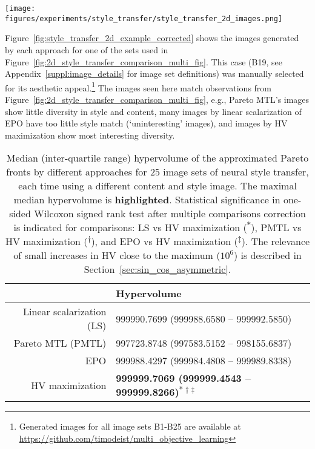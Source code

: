\begin{figure*}[h!]
\centering
\texttt{[image: figures/experiments/style\_transfer/style\_transfer\_2d\_images.png]}
\caption{Images generated by all four approaches for image set B19.} %
\label{fig:style_transfer_2d_example_corrected}
\end{figure*}

Figure~\ref{fig:style_transfer_2d_example_corrected} shows the images generated by each approach for one of the sets used in Figure~\ref{fig:2d_style_transfer_comparison_multi_fig}. This case (B19, see Appendix~\ref{suppl:image_details} for image set definitions) was manually selected for its aesthetic appeal.\footnote{Generated images for all image sets B1-B25 are available at \url{https://github.com/timodeist/multi_objective_learning}}%
The images seen here match observations from Figure~\ref{fig:2d_style_transfer_comparison_multi_fig}, e.g., Pareto MTL's images show little diversity in style and content, many images by linear scalarization of EPO have too little style match (`uninteresting' images), and images by HV maximization show most interesting diversity.

\begin{table}[]
\renewcommand{\arraystretch}{1.5}
\centering
\caption{\small{Median (inter-quartile range) hypervolume of the approximated Pareto fronts by different approaches for 25 image sets of neural style transfer, each time using a different content and style image. The maximal median hypervolume is \textbf{highlighted}. Statistical significance in one-sided Wilcoxon signed rank test after multiple comparisons correction is indicated for comparisons: LS vs HV maximization (\textsuperscript{$\ast$}), PMTL vs HV maximization (\textsuperscript{$\dagger$}), and EPO vs HV maximization (\textsuperscript{$\ddagger$}).
The relevance of small increases in HV close to the maximum ($10^{6}$) is described in Section~\ref{sec:sin_cos_asymmetric}.
}}
\label{tab:HV_style_transfer}
\begin{tabular}{rl}
\toprule
\textbf{} & \textbf{Hypervolume}\\
\midrule
\small Linear scalarization (LS) & \footnotesize 999990.7699 (999988.6580 -- 999992.5850)\\
\small Pareto MTL (PMTL) & \footnotesize 997723.8748 (997583.5152 -- 998155.6837)\\
\small EPO & \footnotesize 999988.4297 (999984.4808 -- 999989.8338)\\
\small HV maximization & \footnotesize \textbf{999999.7069 (999999.4543 -- 999999.8266)\textsuperscript{$\ast \dagger \ddagger$}}\\
\bottomrule
\end{tabular}
\end{table}

